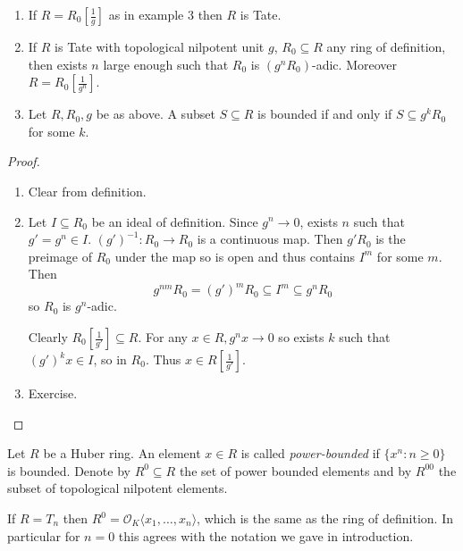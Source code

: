 \documentclass[a4paper]{article}
\renewcommand*{\O}{\mathcal{O}}
\begin{document}
\begin{proposition}\leavevmode
  \begin{enumerate}
  \item If \(R = R_0[\frac{1}{g}]\) as in example 3 then \(R\) is Tate.
  \item If \(R\) is Tate with topological nilpotent unit \(g\), \(R_0 \subseteq R\) any ring of definition, then exists \(n\) large enough such that \(R_0\) is \((g^nR_0)\)-adic.  Moreover \(R = R_0[\frac{1}{g^n}]\).
  \item Let \(R, R_0, g\) be as above. A subset \(S \subseteq R\) is bounded if and only if \(S \subseteq g^{k}R_0\) for some \(k\).
  \end{enumerate}
\end{proposition}

\begin{proof}\leavevmode
  \begin{enumerate}
  \item Clear from definition.
  \item Let \(I \subseteq R_0\) be an ideal of definition. Since \(g^n \to 0\), exists \(n\) such that \(g' = g^n \in I\). \((g')^{-1}: R_0 \to R_0\) is a continuous map. Then \(g'R_0\) is the preimage of \(R_0\) under the map so is open and thus contains \(I^m\) for some \(m\). Then
    \[
      g^{nm}R_0 = (g')^mR_0 \subseteq I^m \subseteq g^nR_0
    \]
    so \(R_0\) is \(g^n\)-adic.

    Clearly \(R_0[\frac{1}{g'}] \subseteq R\). For any \(x \in R, g^nx \to 0\) so exists \(k\) such that \((g')^kx \in I\), so in \(R_0\). Thus \(x \in R[\frac{1}{g'}]\).
  \item Exercise.
  \end{enumerate}
\end{proof}

\begin{definition}
  Let \(R\) be a Huber ring. An element \(x \in R\) is called \emph{power-bounded} if \(\{x^n:n \geq 0\}\) is bounded. Denote by \(R^0 \subseteq R\) the set of power bounded elements and by \(R^{00}\) the subset of topological nilpotent elements.

\end{definition}

\begin{eg}
  If \(R = T_n\) then \(R^0 = \O_K \langle x_1, \dots, x_n \rangle\), which is the same as the ring of definition. In particular for \(n = 0\) this agrees with the notation we gave in introduction.
\end{eg}
\end{document}
